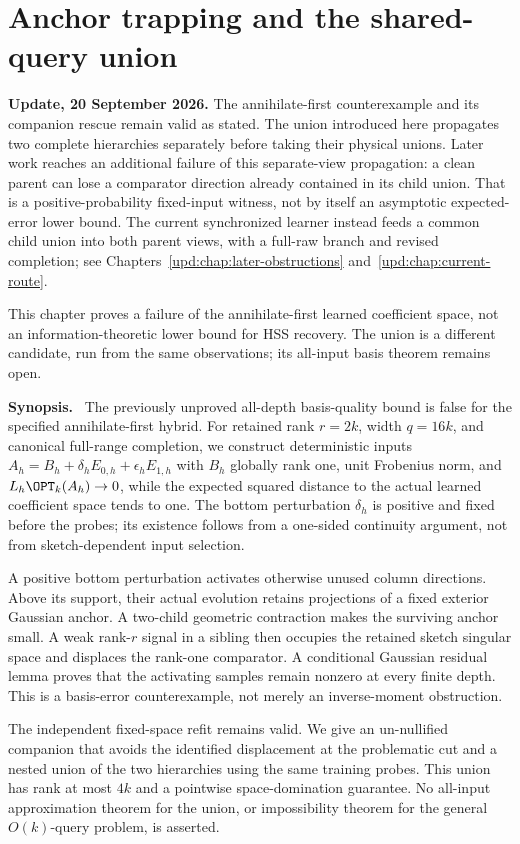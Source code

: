 \documentclass[11pt,oneside,openany,a4paper]{book}
\numberwithin{equation}{chapter}
\theoremstyle{definition}
\theoremstyle{remark}
\newenvironment{chaptersynopsis}{\begingroup\small\textbf{Synopsis.}\ }{\par\endgroup\medskip}
\begin{document}
\chapter{Anchor trapping and the shared-query union}\label{ch:anchor}
\begin{scopebox}
\textbf{Update, 20 September 2026.} The annihilate-first counterexample and its companion rescue remain valid as stated. The union introduced here propagates two complete hierarchies separately before taking their physical unions. Later work reaches an additional failure of this separate-view propagation: a clean parent can lose a comparator direction already contained in its child union. That is a positive-probability fixed-input witness, not by itself an asymptotic expected-error lower bound. The current synchronized learner instead feeds a common child union into both parent views, with a full-raw branch and revised completion; see Chapters~\ref{upd:chap:later-obstructions} and~\ref{upd:chap:current-route}.
\end{scopebox}

\begin{scopebox}
This chapter proves a failure of the annihilate-first learned coefficient space, not an information-theoretic lower bound for HSS recovery. The union is a different candidate, run from the same observations; its all-input basis theorem remains open.
\end{scopebox}
\thispagestyle{plain}
\begin{chaptersynopsis}
The previously unproved all-depth basis-quality bound is false for the specified annihilate-first hybrid. For retained rank $r=2k$, width $q=16k$, and canonical full-range completion, we construct deterministic inputs $A_h=B_h+\delta_h E_{0,h}+\epsilon_h E_{1,h}$ with $B_h$ globally rank one, unit Frobenius norm, and $L_h\OPT_k(A_h)\to0$, while the expected squared distance to the actual learned coefficient space tends to one. The bottom perturbation $\delta_h$ is positive and fixed before the probes; its existence follows from a one-sided continuity argument, not from sketch-dependent input selection.

A positive bottom perturbation activates otherwise unused column directions. Above its support, their actual evolution retains projections of a fixed exterior Gaussian anchor. A two-child geometric contraction makes the surviving anchor small. A weak rank-$r$ signal in a sibling then occupies the retained sketch singular space and displaces the rank-one comparator. A conditional Gaussian residual lemma proves that the activating samples remain nonzero at every finite depth. This is a basis-error counterexample, not merely an inverse-moment obstruction.

The independent fixed-space refit remains valid. We give an un-nullified companion that avoids the identified displacement at the problematic cut and a nested union of the two hierarchies using the same training probes. This union has rank at most $4k$ and a pointwise space-domination guarantee. No all-input approximation theorem for the union, or impossibility theorem for the general $O(k)$-query problem, is asserted.
\end{chaptersynopsis}
\end{document}
